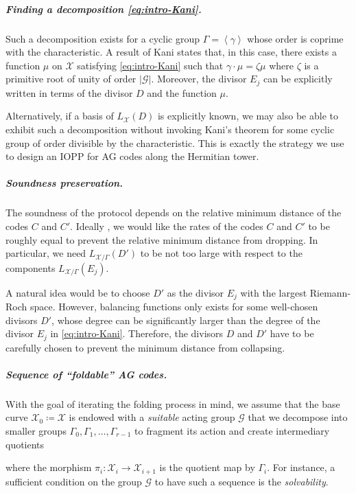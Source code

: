 \documentclass[a4paper,USenglish,autoref]{lipics-v2021}
\newcommand\gen[1]{\left\langle #1 \right\rangle}
\newcommand{\size}[1]{\left|#1\right|}
\newcommand\calX{\mathcal{X}}
\newcommand\calG{\mathcal{G}}
\newcommand\mydef{\coloneqq}
\begin{document}
\subparagraph*{Finding a decomposition \eqref{eq:intro-Kani}.}

Such a decomposition exists for a cyclic group $\Gamma=\gen{\gamma}$ whose order is coprime with the characteristic. A result of Kani \cite{Kani}  states that, in this case, there exists a function $\mu$ on $\calX$ satisfying \eqref{eq:intro-Kani} such that $\gamma\cdot \mu = \zeta \mu$ where $\zeta$ is a primitive root of unity of order $\size{\calG}$. Moreover, the divisor $E_{j}$ can be explicitly written in terms of the divisor $D$ and the function $\mu$.

Alternatively, if a basis of $L_\calX(D)$ is explicitly known, we may also be able to exhibit such a decomposition without invoking Kani's theorem for some cyclic group of order divisible by the characteristic. This is exactly the strategy we use to design an IOPP for AG codes along the Hermitian tower.


\subparagraph*{Soundness preservation.}


The soundness of the protocol depends on the relative minimum distance of the codes $C$ and $C'$. Ideally , we would like the rates of the codes $C$ and $C'$ to be roughly equal to prevent the relative minimum distance from dropping. In particular, we need $L_{\calX/\Gamma}(D')$ to be not too large with respect to the components $L_{\calX/\Gamma}(E_j)$.


A natural idea would be to choose $D'$ as the divisor $E_j$ with the largest Riemann-Roch space. However, balancing functions only exists for some well-chosen divisors $D'$, whose degree can be significantly larger than the degree of the divisor $E_{j}$ in \eqref{eq:intro-Kani}. Therefore, the divisors $D$ and $D'$ have to be carefully chosen to prevent the minimum distance from collapsing.

\subparagraph*{Sequence of ``foldable'' AG codes.} With the goal of iterating the folding process in mind, we assume that the base curve $\calX_0 \mydef \calX$ is endowed with a \emph{suitable} acting group $\calG$ that we decompose into smaller groups $\Gamma_0, \Gamma_1, \dots, \Gamma_{r-1}$ to fragment its action and create intermediary quotients
\begin{center}
\end{center}
where the morphism $\pi_i:\calX_i \rightarrow \calX_{i+1}$ is the quotient map by $\Gamma_i$.
For instance, a sufficient condition on the group $\calG$ to have such a sequence is the \emph{solvability}. 
\end{document}
